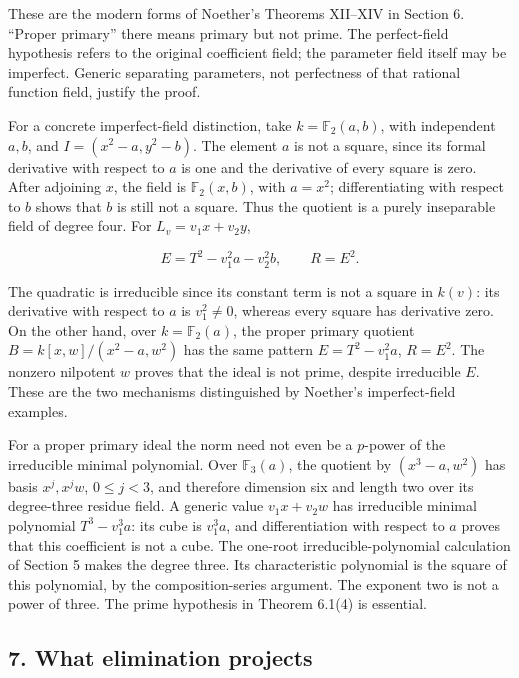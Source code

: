 \documentclass[
]{article}
\begin{document}
These are the modern forms of Noether's Theorems XII--XIV in Section 6.
``Proper primary'' there means primary but not prime. The perfect-field
hypothesis refers to the original coefficient field; the parameter field
itself may be imperfect. Generic separating parameters, not perfectness
of that rational function field, justify the proof.

For a concrete imperfect-field distinction, take \(k=\mathbb F_2(a,b)\),
with independent \(a,b\), and \(I=(x^2-a,y^2-b)\). The element \(a\) is
not a square, since its formal derivative with respect to \(a\) is one
and the derivative of every square is zero. After adjoining \(x\), the
field is \(\mathbb F_2(x,b)\), with \(a=x^2\); differentiating with
respect to \(b\) shows that \(b\) is still not a square. Thus the
quotient is a purely inseparable field of degree four. For
\(L_v=v_1x+v_2y\),

\[
E=T^2-v_1^2a-v_2^2b,\qquad R=E^2.
\]

The quadratic is irreducible since its constant term is not a square in
\(k(v)\): its derivative with respect to \(a\) is \(v_1^2\ne0\), whereas
every square has derivative zero. On the other hand, over
\(k=\mathbb F_2(a)\), the proper primary quotient
\(B=k[x,w]/(x^2-a,w^2)\) has the same pattern \(E=T^2-v_1^2a\),
\(R=E^2\). The nonzero nilpotent \(w\) proves that the ideal is not
prime, despite irreducible \(E\). These are the two mechanisms
distinguished by Noether's imperfect-field examples.

For a proper primary ideal the norm need not even be a \(p\)-power of
the irreducible minimal polynomial. Over \(\mathbb F_3(a)\), the
quotient by \((x^3-a,w^2)\) has basis \(x^j,x^jw\), \(0\le j<3\), and
therefore dimension six and length two over its degree-three residue
field. A generic value \(v_1x+v_2w\) has irreducible minimal polynomial
\(T^3-v_1^3a\): its cube is \(v_1^3a\), and differentiation with respect
to \(a\) proves that this coefficient is not a cube. The one-root
irreducible-polynomial calculation of Section 5 makes the degree three.
Its characteristic polynomial is the square of this polynomial, by the
composition-series argument. The exponent two is not a power of three.
The prime hypothesis in Theorem 6.1(4) is essential.

\subsection{7. What elimination
projects}\label{what-elimination-projects}
\end{document}
